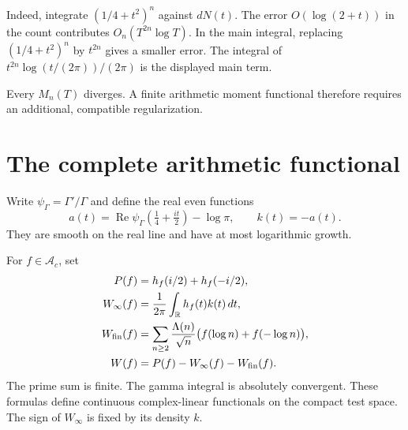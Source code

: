 Indeed, integrate \((1/4+t^2)^n\) against \(dN(t)\).
The error \(O(\log(2+t))\) in the count contributes
\(O_n(T^{2n}\log T)\). In the main integral, replacing
\((1/4+t^2)^n\) by \(t^{2n}\) gives a smaller error.
The integral of \(t^{2n}\log(t/(2\pi))/(2\pi)\) is the displayed main term.

Every \(M_n(T)\) diverges. A finite arithmetic moment functional
therefore requires an additional, compatible regularization.

\section{The complete arithmetic functional}
\label{v4-arith:weil:functional}

Write \(\psi_\Gamma=\Gamma'/\Gamma\) and define the real even functions
\begin{equation}
 a(t)=\operatorname{Re}\psi_\Gamma(\tfrac14+\tfrac{it}{2})-\log\pi,
 \qquad k(t)=-a(t).
 \label{v4-arith:weil:eq:gamma-kernels}
\end{equation}
They are smooth on the real line and have at most logarithmic growth.

For \(f\in\mathscr A_c\), set
\begin{align}
 P(f)&=h_f(i/2)+h_f(-i/2),\notag\\
 W_\infty(f)&=\frac1{2\pi}\int_{\mathbb R}h_f(t)k(t)\,dt,\notag\\
 W_{\mathrm{fin}}(f)&=
       \sum_{n\ge2}\frac{\Lambda(n)}{\sqrt n}
                    \bigl(f(\log n)+f(-\log n)\bigr),\notag\\
 W(f)&=P(f)-W_\infty(f)-W_{\mathrm{fin}}(f).
 \label{v4-arith:weil:eq:functional}
\end{align}
The prime sum is finite. The gamma integral is absolutely convergent.
These formulas define continuous complex-linear functionals on the
compact test space. The sign of \(W_\infty\) is fixed by its density \(k\).

